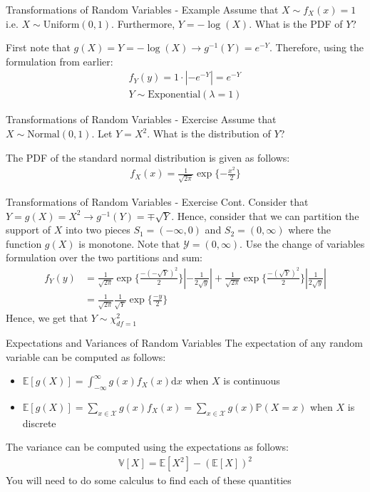 \documentclass{beamer}
\begin{document}
\begin{frame}{Transformations of Random Variables - Example}
Assume that $X\sim f_{X}(x) = 1$ i.e. $X\sim\mathrm{Uniform}(0, 1)$. Furthermore, $Y = -\log(X)$. What is the PDF of $Y$?
\newline 

First note that $g(X)  = Y  = -\log (X) \rightarrow g^{-1}(Y) = e^{-Y}$. Therefore, using the formulation from earlier:
\begin{align*}
f_{Y}(y) = 1 \cdot |-e^{-Y}| = e^{-Y} \\
Y \sim \mathrm{Exponential}(\lambda = 1)
\end{align*}
\end{frame}

\begin{frame}{Transformations of Random Variables - Exercise}
Assume that $X\sim \mathrm{Normal}(0,1)$. Let $Y = X^{2}$. What is the distribution of $Y$?
\newline

The PDF of the standard normal distribution is given as follows:
\begin{align*}
f_{X}(x) = \frac{1}{\sqrt{2\pi}} \exp\{-\frac{x^{2}}{2}\}
\end{align*}
\end{frame}

\begin{frame}{Transformations of Random Variables - Exercise Cont.}
Consider that $Y = g(X) = X^{2} \rightarrow g^{-1}(Y) = \mp \sqrt{Y}$. Hence, consider that we can partition the support of $X$ into two pieces $S_{1} = (-\infty, 0)$ and $S_{2} = (0, \infty)$ where the function $g(X)$ is monotone. Note that $\mathcal{Y} = (0, \infty)$. Use the change of variables formulation over the two partitions and sum:
\begin{align*}
f_{Y}(y) &= \frac{1}{\sqrt{2\pi}}\exp\{\frac{-(-\sqrt{Y})^{2}}{2}\}|-\frac{1}{2\sqrt{y}}| + \frac{1}{\sqrt{2\pi}}\exp\{\frac{-(\sqrt{Y})^{2}}{2}\}|\frac{1}{2\sqrt{y}}| \\
&= \frac{1}{\sqrt{2\pi}}\frac{1}{\sqrt{Y}}\exp\{\frac{-y}{2}\}
\end{align*}
Hence, we get that $Y \sim \chi^{2}_{df = 1}$
\end{frame}

\begin{frame}{Expectations and Variances of Random Variables}
The expectation of any random variable can be computed as follows:
\begin{itemize}
\item{$\mathbb{E}[g(X)] = \int_{-\infty}^{\infty}g(x)f_{X}(x) \mathrm{d}x$ when $X$ is continuous}
\item{$\mathbb{E}[g(X)] = \sum_{x\in\mathcal{X}}g(x)f_{X}(x) = \sum_{x\in\mathcal{X}}g(x)\mathbb{P}(X = x)$ when $X$ is discrete}
\end{itemize}
The variance can be computed using the expectations as follows:
\begin{align*}
\mathbb{V}[X]  = \mathbb{E}[X^{2}] - (\mathbb{E}[X])^{2}
\end{align*}
You will need to do some calculus to find each of these quantities
\end{frame}
\end{document}
